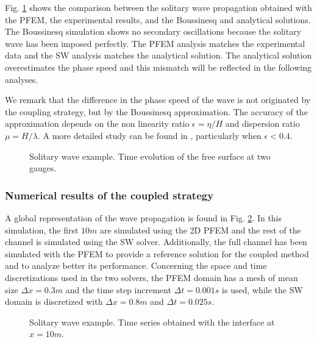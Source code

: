 Fig. \ref{solitary_wave} shows the comparison between the solitary wave propagation obtained with the PFEM, the experimental results, and the Boussinesq and analytical solutions. The Boussinesq simulation shows no secondary oscillations because the solitary wave has been imposed perfectly. The PFEM analysis matches the experimental data and the SW analysis matches the analytical solution. The analytical solution overestimates the phase speed and this mismatch will be reflected in the following analyses. 

We remark that the difference in the phase speed of the wave is not originated by the coupling strategy, but by the Boussinesq approximation. The accuracy of the approximation depends on the non linearity ratio $\epsilon = \eta/H$ and dispersion ratio $\mu = H / \lambda$. A more detailed study can be found in \cite{wu2018}, particularly when $\epsilon<0.4$.


\begin{figure} [htb]
    \centering
    \caption{Solitary wave example. Time evolution of the free surface at two gauges.}
    \label{solitary_wave}
\end{figure}



\subsubsection{Numerical results of the coupled strategy}

A global representation of the wave propagation is found in Fig. \ref{solitary_wave_propagation}. In this simulation, the first $10m$ are simulated using the 2D PFEM and the rest of the channel is simulated using the SW solver. Additionally, the full channel has been simulated with the PFEM to provide a reference solution for the coupled method and to analyze better its performance. Concerning the space and time discretizations used in the two solvers, the PFEM domain has a mesh of mean size $\Delta x=0.3m$ and the time step increment $\Delta t=0.001s$ is used, while the SW domain is discretized with $\Delta x=0.8m$ and $\Delta t=0.025s$.

\begin{figure} [htb]
    \centering
    \caption{Solitary wave example. Time series obtained with the interface at $x=10m$.}
    \label{solitary_wave_propagation}
\end{figure}

